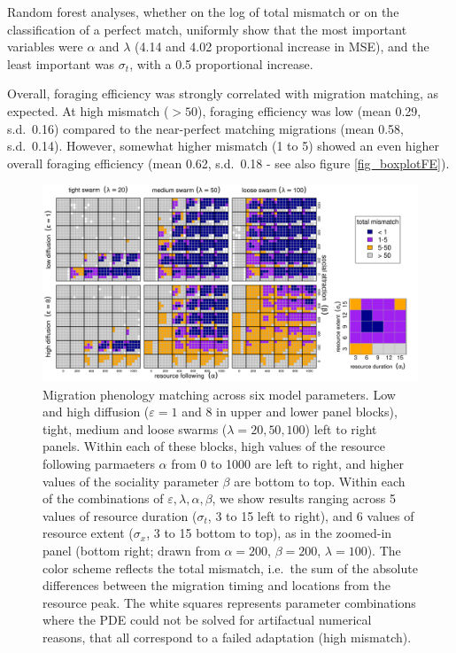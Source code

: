 \documentclass[utf8]{frontiersSCNS} %
\begin{document}
	Random forest analyses, whether on the log of total mismatch or on the classification of a perfect match, uniformly show that the most important variables \citep{Breiman2001} were $\alpha$ and $\lambda$ (4.14 and 4.02 proportional increase in MSE), and the least important was $\sigma_t$, with a 0.5 proportional increase.
	
	Overall, foraging efficiency was strongly correlated with migration matching, as expected. At high mismatch ($>50$), foraging efficiency was low (mean 0.29, s.d.~0.16) compared to the near-perfect matching migrations (mean 0.58, s.d.~0.14). However, somewhat higher mismatch (1 to 5) showed an even higher overall foraging efficiency (mean 0.62, s.d.~0.18 - see also figure \ref{fig_boxplotFE}).
	
	\begin{figure}
		\includegraphics[width = \textwidth]{figures/StabilityResults.png} 
		\caption{\label{fig_phenologymatching} Migration phenology matching across six model parameters. Low and high diffusion ($\varepsilon = 1$ and $8$ in upper and lower panel blocks), tight, medium and loose swarms ($\lambda = 20, 50, 100$) left to right panels. Within each of these blocks, high values of the resource following parmaeters $\alpha$ from 0 to 1000 are left to right, and higher values of the sociality parameter $\beta$ are bottom to top. Within each of the combinations of $\varepsilon, \lambda, \alpha, \beta$, we show results ranging across 5 values of resource duration ($\sigma_t$, 3 to 15 left to right), and 6 values of resource extent ($\sigma_x$, 3 to 15 bottom to top), as in the zoomed-in panel (bottom right; drawn from $\alpha = 200$, $\beta = 200$, $\lambda = 100$). The color scheme reflects the total mismatch, i.e.~the sum of the absolute differences between the migration timing and locations from the resource peak. The white squares represents parameter combinations where the PDE could not be solved for artifactual numerical reasons, that all correspond to a failed adaptation (high mismatch). }
	\end{figure}
	
\end{document}
